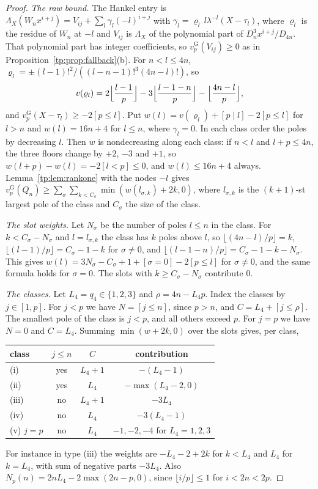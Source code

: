 \documentclass[11pt]{amsart}
\theoremstyle{definition}
\theoremstyle{remark}
\numberwithin{equation}{section}
\newcommand{\vG}{v_p^{\mathrm G}}
\begin{document}
\begin{proof}
\emph{The raw bound.} The Hankel entry is $\Lambda_X(W_nx^{i+j})=V_{ij}+\sum_l\gamma_l(-l)^{i+j}$ with
$\gamma_l=\varrho_l\,l\lambda^{-l}(X-\tau_l)$, where $\varrho_l$ is the residue of $W_n$ at $-l$ and $V_{ij}$ is
$\Lambda_X$ of the polynomial part of $D_n^3x^{i+j}/D_{4n}$. That polynomial part has integer coefficients, so
$\vG(V_{ij})\ge0$ as in Proposition~\ref{tp:prop:fallback}(b). For $n<l\le4n$,
$\varrho_l=\pm(l-1)!^2/((l-n-1)!^3(4n-l)!)$, so
\[
 v(\varrho_l)=2\Bigl\lfloor\frac{l-1}p\Bigr\rfloor-3\Bigl\lfloor\frac{l-1-n}p\Bigr\rfloor-\Bigl\lfloor\frac{4n-l}p\Bigr\rfloor,
\]
and $\vG(X-\tau_l)\ge-2[p\le l]$. Put $w(l)=v(\varrho_l)+[p\mid l]-2[p\le l]$ for $l>n$ and $w(l)=16n+4$ for $l\le n$,
where $\gamma_l=0$. In each class order the poles by decreasing $l$. Then $w$ is nondecreasing along each class: if
$n<l$ and $l+p\le4n$, the three floors change by $+2$, $-3$ and $+1$, so $w(l+p)-w(l)=-2[l<p]\le0$, and $w(l)\le16n+4$
always. Lemma~\ref{tp:lem:rankone} with the nodes $-l$ gives
$\vG(Q_n)\ge\sum_\sigma\sum_{k<C_\sigma}\min(w(l_{\sigma,k})+2k,0)$, where $l_{\sigma,k}$ is the $(k+1)$-st largest pole
of the class and $C_\sigma$ the size of the class.

\emph{The slot weights.} Let $N_\sigma$ be the number of poles $l\le n$ in the class. For $k<C_\sigma-N_\sigma$ and
$l=l_{\sigma,k}$ the class has $k$ poles above $l$, so $\lfloor(4n-l)/p\rfloor=k$, $\lfloor(l-1)/p\rfloor=C_\sigma-1-k$
for $\sigma\ne0$, and $\lfloor(l-1-n)/p\rfloor=C_\sigma-1-k-N_\sigma$. This gives
$w(l)=3N_\sigma-C_\sigma+1+[\sigma=0]-2[p\le l]$ for $\sigma\ne0$, and the same formula holds for $\sigma=0$. The
slots with $k\ge C_\sigma-N_\sigma$ contribute $0$.

\emph{The classes.} Let $L_4=q_4\in\{1,2,3\}$ and $\rho=4n-L_4p$. Index the classes by $j\in[1,p]$. For $j<p$ we have
$N=[j\le n]$, since $p>n$, and $C=L_4+[j\le\rho]$. The smallest pole of the class is $j<p$, and all others exceed $p$.
For $j=p$ we have $N=0$ and $C=L_4$. Summing $\min(w+2k,0)$ over the slots gives, per class,
\begin{center}
\begin{tabular}{@{}lccc@{}}
\toprule
class & $j\le n$ & $C$ & contribution\\
\midrule
(i) & yes & $L_4+1$ & $-(L_4-1)$\\
(ii) & yes & $L_4$ & $-\max(L_4-2,0)$\\
(iii) & no & $L_4+1$ & $-3L_4$\\
(iv) & no & $L_4$ & $-3(L_4-1)$\\
(v) $j=p$ & no & $L_4$ & $-1,-2,-4$ for $L_4=1,2,3$\\
\bottomrule
\end{tabular}
\end{center}
For instance in type (iii) the weights are $-L_4-2+2k$ for $k<L_4$ and $L_4$ for $k=L_4$, with sum of negative parts
$-3L_4$. Also $N_p(n)=2nL_4-2\max(2n-p,0)$, since $\lfloor i/p\rfloor\le1$ for $i<2n<2p$.


\end{proof}
\end{document}

